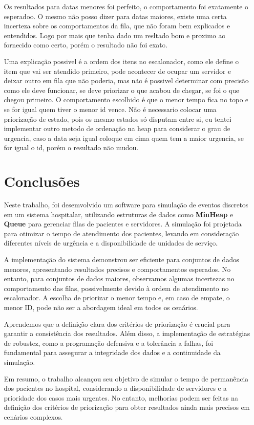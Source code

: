 \documentclass[a4paper,12pt]{article}
\begin{document}
Os resultados para datas menores foi perfeito, o comportamento foi exatamente o esperadoo. O mesmo não posso dizer para datas maiores,
existe uma certa incerteza sobre os comportamentos da fila, que não foram bem explicados e entendidos. 
Logo por mais que tenha dado um resltado bom e proximo ao fornecido como certo, porém o resultado não foi exato.

Uma explicação possivel é a ordem dos itens no escalonador, como ele define o item que vai ser atendido primeiro,
pode acontecer de ocupar um servidor e deixar outro em fila que não poderia, mas não é possivel determinar com precisão como ele deve funcionar,
se deve priorizar o que acabou de chegar, se foi o que chegou primeiro.
O comportamento escolhido é que o menor tempo fica no topo e se for igual quem tiver o menor id vence. 
Não é necessario colocar uma priorização de estado, pois os mesmo estados só disputam entre si, 
eu tentei implementar outro metodo de ordenação na heap para considerar o grau de urgencia, 
caso a data seja igual coloque em cima quem tem a maior urgencia, se for igual o id, porém o resultado não mudou.

\section{Conclusões}
\hspace*{1cm}
Neste trabalho, foi desemvolvido um software para simulação de eventos discretos em um sistema hospitalar, utilizando estruturas de dados como \textbf{MinHeap} e \textbf{Queue} para gerenciar filas de pacientes e servidores. A simulação foi projetada para otimizar o tempo de atendimento dos pacientes, levando em consideração diferentes níveis de urgência e a disponibilidade de unidades de serviço.

A implementação do sistema demonstrou ser eficiente para conjuntos de dados menores, apresentando resultados precisos e comportamentos esperados. No entanto, para conjuntos de dados maiores, observamos algumas incertezas no comportamento das filas, possivelmente devido à ordem de atendimento no escalonador. A escolha de priorizar o menor tempo e, em caso de empate, o menor ID, pode não ser a abordagem ideal em todos os cenários.

Aprendemos que a definição clara dos critérios de priorização é crucial para garantir a consistência dos resultados. Além disso, a implementação de estratégias de robustez, como a programação defensiva e a tolerância a falhas, foi fundamental para assegurar a integridade dos dados e a continuidade da simulação.

Em resumo, o trabalho alcançou seu objetivo de simular o tempo de permanência dos pacientes no hospital, considerando a disponibilidade de servidores e a prioridade dos casos mais urgentes. No entanto, melhorias podem ser feitas na definição dos critérios de priorização para obter resultados ainda mais precisos em cenários complexos.
\end{document}

